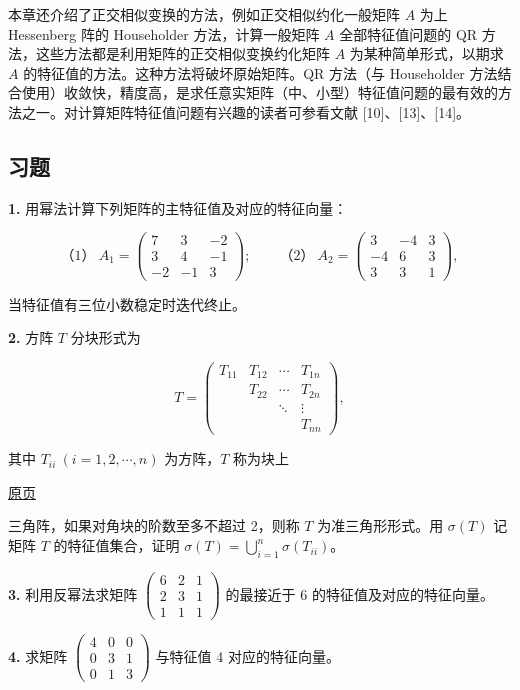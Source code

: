 \documentclass[
  10pt,
  fontset=fandol]{ctexart}
\begin{document}
本章还介绍了正交相似变换的方法，例如正交相似约化一般矩阵 \(A\) 为上 Hessenberg 阵的 Householder 方法，计算一般矩阵 \(A\) 全部特征值问题的 QR 方法，这些方法都是利用矩阵的正交相似变换约化矩阵 \(A\) 为某种简单形式，以期求 \(A\) 的特征值的方法。这种方法将破坏原始矩阵。QR 方法（与 Householder 方法结合使用）收敛快，精度高，是求任意实矩阵（中、小型）特征值问题的最有效的方法之一。对计算矩阵特征值问题有兴趣的读者可参看文献 {[}10{]}、{[}13{]}、{[}14{]}。

\subsection{习题}\label{ux4e60ux9898}

\textbf{1.} 用幂法计算下列矩阵的主特征值及对应的特征向量：

\[
\text{（1）}\ A_1=\begin{pmatrix}7&3&-2\\3&4&-1\\-2&-1&3\end{pmatrix};\qquad
\text{（2）}\ A_2=\begin{pmatrix}3&-4&3\\-4&6&3\\3&3&1\end{pmatrix},
\]

当特征值有三位小数稳定时迭代终止。

\textbf{2.} 方阵 \(T\) 分块形式为

\[
T=\begin{pmatrix}
T_{11}&T_{12}&\cdots&T_{1n}\\
&T_{22}&\cdots&T_{2n}\\
&&\ddots&\vdots\\
&&&T_{nn}
\end{pmatrix},
\]

其中 \(T_{ii}\ (i=1,2,\cdots,n)\) 为方阵，\(T\) 称为块上

\href{../../source-images/pdf-260.jpeg}{原页}

三角阵，如果对角块的阶数至多不超过 2，则称 \(T\) 为准三角形形式。用 \(\sigma(T)\) 记矩阵 \(T\) 的特征值集合，证明 \(\sigma(T)=\displaystyle\bigcup_{i=1}^{n}\sigma(T_{ii})\)。

\textbf{3.} 利用反幂法求矩阵 \(\begin{pmatrix}6&2&1\\2&3&1\\1&1&1\end{pmatrix}\) 的最接近于 6 的特征值及对应的特征向量。

\textbf{4.} 求矩阵 \(\begin{pmatrix}4&0&0\\0&3&1\\0&1&3\end{pmatrix}\) 与特征值 4 对应的特征向量。
\end{document}
